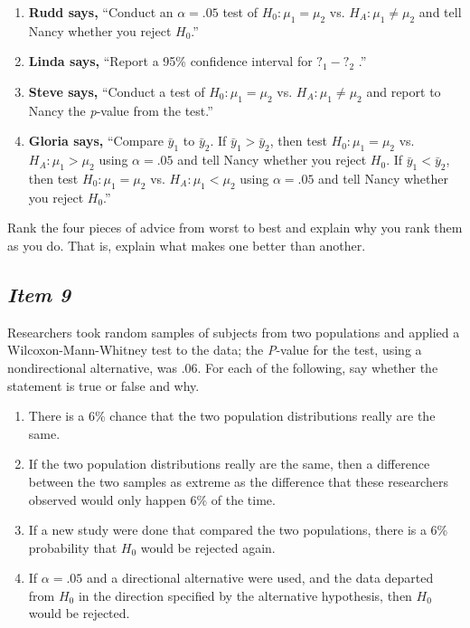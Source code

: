 \documentclass[twoside,openany]{tufte-book}
\begin{document}
\begin{enumerate}[leftmargin=1cm, itemsep=.2em]
\item \textbf{Rudd says,} ``Conduct an $\alpha=.05$ test of $H_0: \mu_1=\mu_2$ vs. $H_A: \mu_1 \neq \mu_2$ and tell Nancy whether you reject $H_0$.''

\item \textbf{Linda says,} ``Report a 95\% confidence interval for $?_1 - ?_2$ .''

\newpage

\item \textbf{Steve says,} ``Conduct a test of $H_0: \mu_1=\mu_2$ vs. $H_A: \mu_1 \neq \mu_2$ and report to Nancy the \textit{p}-value from the test.''

\item \textbf{Gloria says,} ``Compare $\bar{y}_1$  to $\bar{y}_2$.  If $\bar{y}_1 > \bar{y}_2$,  then test $H_0: \mu_1=\mu_2$ vs. $H_A: \mu_1 > \mu_2$ using $\alpha =.05$ and tell Nancy whether you reject $H_0$.  If $\bar{y}_1 < \bar{y}_2$,  then test $H_0: \mu_1=\mu_2$ vs. $H_A: \mu_1 < \mu_2$ using $\alpha = .05$ and tell Nancy whether you reject $H_0$.''
\end{enumerate}

Rank the four pieces of advice from worst to best and explain why you rank them as you do. That is, explain what makes one better than another.

\subsection{\textbf{\textit{Item 9}}}
Researchers took random samples of subjects from two populations and applied a Wilcoxon-Mann-Whitney test to the data; the \textit{P}-value for the test, using a nondirectional alternative, was .06.  For each of the following, say whether the statement is true or false and why.
\begin{enumerate}[leftmargin=1cm, itemsep=.2em]
\item There is a 6\% chance that the two population distributions really are the same.
\item If the two population distributions really are the same, then a difference between the two samples as extreme as the difference that these researchers observed would only happen 6\% of the time.
\item If a new study were done that compared the two populations, there is a 6\% probability that $H_0$ would be rejected again.
\item If $\alpha = .05$ and a directional alternative were used, and the data departed from $H_0$ in the direction specified by the alternative hypothesis, then $H_0$ would be rejected.
\end{enumerate}
\end{document}
